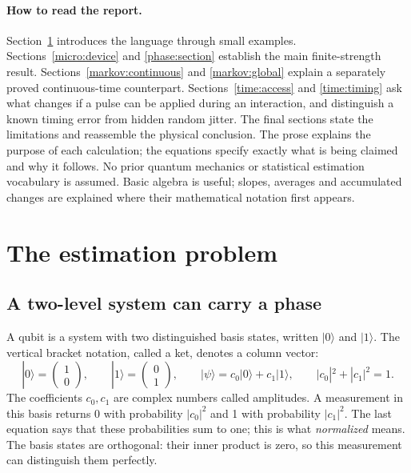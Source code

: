 \documentclass[11pt,a4paper]{article}
\numberwithin{equation}{section}
\theoremstyle{remark}
\begin{document}
\paragraph{How to read the report.}
Section~\ref{intro:task} introduces the language through small examples.
Sections~\ref{micro:device} and \ref{phase:section} establish the main
finite-strength result. Sections~\ref{markov:continuous} and
\ref{markov:global} explain a separately proved continuous-time counterpart.
Sections~\ref{time:access} and \ref{time:timing} ask what changes if a pulse
can be applied during an interaction, and distinguish a known timing error
from hidden random jitter. The final sections state the limitations and
reassemble the physical conclusion. The prose explains the purpose of each
calculation; the equations specify exactly what is being claimed and why it
follows. No prior quantum mechanics or statistical estimation vocabulary is
assumed. Basic algebra is useful; slopes, averages and accumulated changes
are explained where their mathematical notation first appears.

\section{The estimation problem}
\label{intro:task}

\subsection{A two-level system can carry a phase}

A qubit is a system with two distinguished basis states, written
$|0\rangle$ and $|1\rangle$. The vertical bracket notation, called a ket,
denotes a column vector:
\begin{equation}
 |0\rangle=\begin{pmatrix}1\\0\end{pmatrix},\qquad
 |1\rangle=\begin{pmatrix}0\\1\end{pmatrix},\qquad
 |\psi\rangle=c_0|0\rangle+c_1|1\rangle,\qquad
 |c_0|^2+|c_1|^2=1.
 \label{intro:state}
\end{equation}
The coefficients $c_0,c_1$ are complex numbers called amplitudes.
A measurement in this basis returns 0 with probability $|c_0|^2$ and 1
with probability $|c_1|^2$. The last equation says that these probabilities
sum to one; this is what \emph{normalized} means. The basis states are
orthogonal: their inner product is zero, so this measurement can distinguish
them perfectly.
\end{document}
